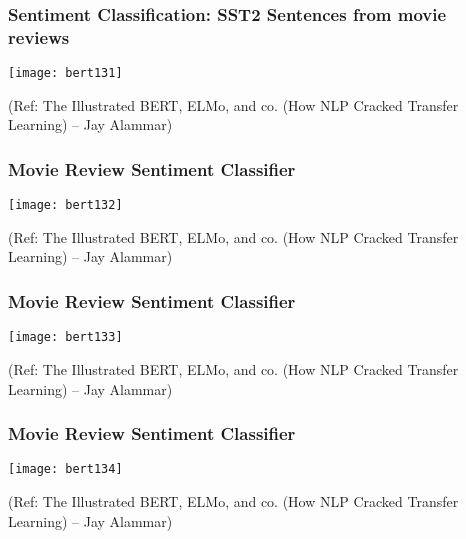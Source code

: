 \begin{frame}[fragile]\frametitle{ Sentiment Classification: SST2 Sentences from movie reviews}

			\begin{center}
			\texttt{[image: bert131]}
			\end{center}	

{\tiny (Ref: The Illustrated BERT, ELMo, and co. (How NLP Cracked Transfer Learning) – Jay Alammar)}

\end{frame}

\begin{frame}[fragile]\frametitle{ Movie Review Sentiment Classifier}

			\begin{center}
			\texttt{[image: bert132]}
			\end{center}	

{\tiny (Ref: The Illustrated BERT, ELMo, and co. (How NLP Cracked Transfer Learning) – Jay Alammar)}

\end{frame}

\begin{frame}[fragile]\frametitle{ Movie Review Sentiment Classifier}

			\begin{center}
			\texttt{[image: bert133]}
			\end{center}	

{\tiny (Ref: The Illustrated BERT, ELMo, and co. (How NLP Cracked Transfer Learning) – Jay Alammar)}

\end{frame}

\begin{frame}[fragile]\frametitle{ Movie Review Sentiment Classifier}

			\begin{center}
			\texttt{[image: bert134]}
			\end{center}	

{\tiny (Ref: The Illustrated BERT, ELMo, and co. (How NLP Cracked Transfer Learning) – Jay Alammar)}

\end{frame}

